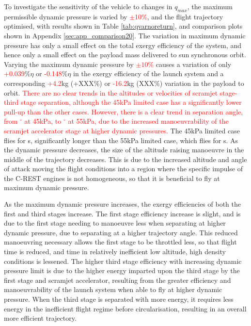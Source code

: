 To investigate the sensitivity of the vehicle to changes in $q_{max}$, the maximum permissible dynamic pressure is varied by \textcolor{red}{$\pm$10\%}, and the flight trajectory optimised, with results shown in Table \ref{tab:qvarnoreturn}, and comparison plots shown in Appendix \ref{sec:app_comparison20}.
The variation in maximum dynamic pressure has only a small effect on the total exergy efficiency of the system, and hence only a small effect on the payload mass delivered to sun synchronous orbit.  Varying the maximum dynamic pressure by \textcolor{red}{$\pm10\%$} causes a variation of only \textcolor{red}{+0.039}\%$\eta$ or \textcolor{red}{-0.148}\%$\eta$ in the exergy efficiency of the launch system and a corresponding \textcolor{red}{+4.2}kg (+XXX\%) or \textcolor{red}{-16.2}kg (XXX\%) variation in the payload to orbit.  
\textcolor{red}{There are no clear trends in the altitudes or velocities of scramjet stage-third stage separation, although the 45kPa limited case has a significantly lower pull-up than the other cases. However, there is a clear trend in separation angle, from \secondthirdSeparationgammaqFortyFiveNoReturn $^\circ$ at 45kPa, to \secondthirdSeparationgammaqFiftyFiveNoReturn $^\circ$ at 55kPa, due to the increased manoeuvrability of the scramjet accelerator stage at higher dynamic pressures. }
The 45kPa limited case flies for \secondFlightTimeqFortyFiveNoReturn s, significantly longer than the 55kPa limited case, which flies for \secondFlightTimeqFiftyFiveNoReturn s.
As the dynamic pressure decreases, the size of the altitude raising manoeuvre in the middle of the trajectory decreases. This is due to the increased altitude and angle of attack moving the flight conditions into a region where the specific impulse of the C-REST engines is not homogeneous, so that it is beneficial to fly at maximum dynamic pressure.  

As the maximum dynamic pressure increases, the exergy efficiencies of both the first and third stages increase. The first stage efficiency increase is slight, and is due to the first stage needing to manoeuvre less when separating at higher dynamic pressure, due to separating at a higher trajectory angle. This reduced manoeuvring necessary allows the first stage to be throttled less, so that flight time is reduced, and time in relatively inefficient low altitude, high density conditions is lessened. The higher third stage efficiency with increasing dynamic pressure limit is due to the higher energy imparted upon the third stage by the first stage and scramjet accelerator, resulting from the greater efficiency and manoeuvrability of the launch system when able to fly at higher dynamic pressure. When the third stage is separated with more energy, it requires less energy in the inefficient flight regime before circularisation, resulting in an overall more efficient trajectory. 



